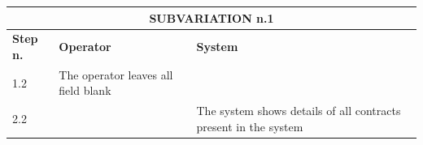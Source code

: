 {{{\begin{center}
			\begin{tabular}{|p{2cm}|p{6cm}|p{6cm}|}
			\hline
				\multicolumn{3}{|c|}{SUBVARIATION n.1} \\
			\hline
				\centering \vspace{1mm} \bfseries{Step n.} \vspace{1mm} & \vspace{1mm} \bfseries{Operator} \vspace{1mm} & \vspace{1mm} \bfseries{System} \vspace{1mm}\\
			\hline
				\vspace{1mm} 1.2 \vspace{1mm} &
				\vspace{1mm} The operator leaves all field blank \vspace{1mm} & 
				\vspace{1mm} \vspace{1mm} \\
			\hline
				\vspace{1mm} 2.2 \vspace{1mm} &
				\vspace{1mm} \vspace{1mm} & 
				\vspace{1mm} The system shows details of all contracts present in the system \vspace{1mm} \\
			\hline
			\end{tabular}
			\end{center}

			\clearpage

}}}
